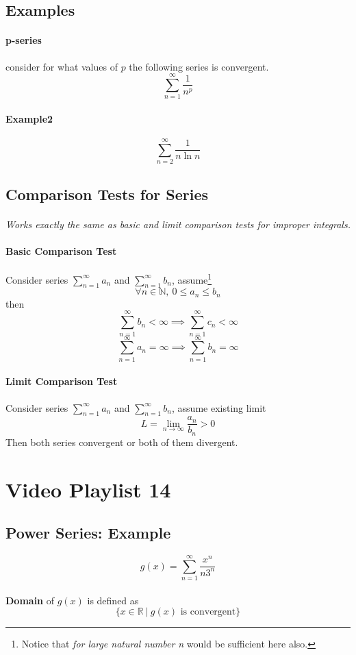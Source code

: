 \documentclass{article}
\newcommand{\R}[0]{\mathbb{R}}
\newcommand{\N}[0]{\mathbb{N}}
\newcommand{\series}[2]{\sum_{#1}^{\infty}{#2}}
\begin{document}
\subsection{Examples}
\paragraph{p-series} consider for what values of $p$ the following series is convergent.
\[
	\series{n=1}{\frac{1}{n^p}}
\]
\paragraph{Example2}
\[
	\series{n=2}{\frac{1}{n\ln{n}}}
\]

\subsection{Comparison Tests for Series}
\paragraph{}\emph{Works exactly the same as basic and limit comparison tests for improper integrals.}
\paragraph{Basic Comparison Test} Consider series $\series{n=1}{a_n}$ and $\series{n=1}{b_n}$, assume\footnote{Notice that \emph{for large natural number n} would be sufficient here also.}
\[
	\forall n \in \N,\ 0 \leq a_n \leq b_n
\]
then 
\[
	\series{n=1}{b_n} < \infty \implies \series{n=1}{c_n} < \infty
\]
\[
	\series{n=1}{a_n} = \infty \implies \series{n=1}{b_n} = \infty
\]
\paragraph{Limit Comparison Test} Consider series $\series{n=1}{a_n}$ and $\series{n=1}{b_n}$, assume existing limit 
\[
	L = \lim_{n\to\infty}\frac{a_n}{b_n} > 0 
\] Then both series convergent or both of them divergent.

\section{Video Playlist 14}
\subsection{Power Series: Example}
\[
	g(x) = \series{n=1}{\frac{x^n}{n3^n}}
\]
\paragraph{} \textbf{Domain} of $g(x)$ is defined as 
\[
	\{x \in \R\ \vert\ g(x) \text{ is convergent}\}
\]
\end{document}
